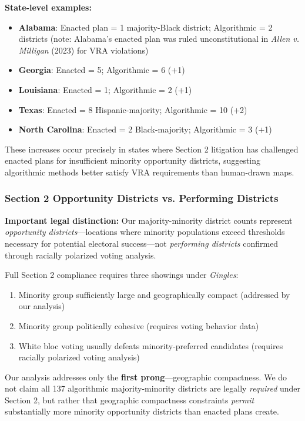 \textbf{State-level examples:}
\begin{itemize}
    \item \textbf{Alabama}: Enacted plan = 1 majority-Black district; Algorithmic = 2 districts (note: Alabama's enacted plan was ruled unconstitutional in \emph{Allen v. Milligan} (2023) for VRA violations)
    \item \textbf{Georgia}: Enacted = 5; Algorithmic = 6 ($+$1)
    \item \textbf{Louisiana}: Enacted = 1; Algorithmic = 2 ($+$1)
    \item \textbf{Texas}: Enacted = 8 Hispanic-majority; Algorithmic = 10 ($+$2)
    \item \textbf{North Carolina}: Enacted = 2 Black-majority; Algorithmic = 3 ($+$1)
\end{itemize}

These increases occur precisely in states where Section 2 litigation has challenged enacted plans for insufficient minority opportunity districts, suggesting algorithmic methods better satisfy VRA requirements than human-drawn maps.

\subsubsection{Section 2 Opportunity Districts vs. Performing Districts}

\textbf{Important legal distinction:} Our majority-minority district counts represent \emph{opportunity districts}---locations where minority populations exceed thresholds necessary for potential electoral success---not \emph{performing districts} confirmed through racially polarized voting analysis.

Full Section 2 compliance requires three showings under \emph{Gingles}:
\begin{enumerate}
    \item Minority group sufficiently large and geographically compact (addressed by our analysis)
    \item Minority group politically cohesive (requires voting behavior data)
    \item White bloc voting usually defeats minority-preferred candidates (requires racially polarized voting analysis)
\end{enumerate}

Our analysis addresses only the \textbf{first prong}---geographic compactness. We do not claim all 137 algorithmic majority-minority districts are legally \emph{required} under Section 2, but rather that geographic compactness constraints \emph{permit} substantially more minority opportunity districts than enacted plans create.

